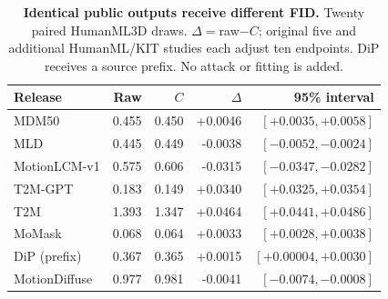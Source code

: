\begin{table}[t]
\centering\footnotesize
\caption{\textbf{Identical public outputs receive different FID.} Twenty paired HumanML3D draws. $\Delta=$raw$-C$; original five and additional HumanML/KIT studies each adjust ten endpoints. DiP receives a source prefix. No attack or fitting is added.}\label{tab:generalreleases}
\begin{tabular}{@{}lrrrr@{}}\toprule
Release&Raw&$C$&$\Delta$&95\% interval\\\midrule
MDM50&0.455&0.450&+0.0046&$[+0.0035,+0.0058]$\\
MLD&0.445&0.449&-0.0038&$[-0.0052,-0.0024]$\\
MotionLCM-v1&0.575&0.606&-0.0315&$[-0.0347,-0.0282]$\\
T2M-GPT&0.183&0.149&+0.0340&$[+0.0325,+0.0354]$\\
T2M&1.393&1.347&+0.0464&$[+0.0441,+0.0486]$\\
MoMask&0.068&0.064&+0.0033&$[+0.0028,+0.0038]$\\
DiP (prefix)&0.367&0.365&+0.0015&$[+0.00004,+0.0030]$\\
MotionDiffuse&0.977&0.981&-0.0041&$[-0.0074,-0.0008]$\\
\bottomrule\end{tabular}\end{table}
